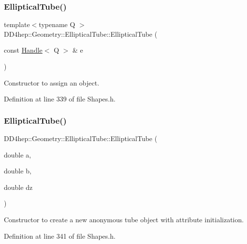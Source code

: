 \subsubsection{\texorpdfstring{Elliptical\+Tube()}{EllipticalTube()}\hspace{0.1cm}{\footnotesize\ttfamily [4/6]}}
{\footnotesize\ttfamily template$<$typename Q $>$ \\
D\+D4hep\+::\+Geometry\+::\+Elliptical\+Tube\+::\+Elliptical\+Tube (\begin{DoxyParamCaption}\item[{const \hyperlink{class_d_d4hep_1_1_handle}{Handle}$<$ Q $>$ \&}]{e }\end{DoxyParamCaption})\hspace{0.3cm}{\ttfamily [inline]}}



Constructor to assign an object. 



Definition at line 339 of file Shapes.\+h.

\hypertarget{class_d_d4hep_1_1_geometry_1_1_elliptical_tube_a4f6811e402eace05bb1640b8d2e50d48}{}\label{class_d_d4hep_1_1_geometry_1_1_elliptical_tube_a4f6811e402eace05bb1640b8d2e50d48} 
\subsubsection{\texorpdfstring{Elliptical\+Tube()}{EllipticalTube()}\hspace{0.1cm}{\footnotesize\ttfamily [5/6]}}
{\footnotesize\ttfamily D\+D4hep\+::\+Geometry\+::\+Elliptical\+Tube\+::\+Elliptical\+Tube (\begin{DoxyParamCaption}\item[{double}]{a,  }\item[{double}]{b,  }\item[{double}]{dz }\end{DoxyParamCaption})\hspace{0.3cm}{\ttfamily [inline]}}



Constructor to create a new anonymous tube object with attribute initialization. 



Definition at line 341 of file Shapes.\+h.

